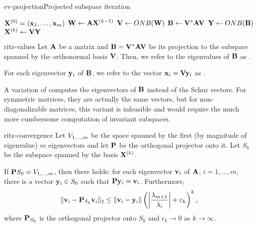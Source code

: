 
\begin{Algorithm*}{ev-projection}{Projected subspace iteration}
  \begin{algorithmic}[1]
    \Require $\matx^{(0)} = (\vx_1,\dots,\vx_m)$
    \State $\matw \gets \mata\matx^{(k-1)}$
    \State $\matv \gets ONB(\matw)$
    \State $\matb \gets \matv^*\mata\matv$
    \State $\maty \gets ONB(\matb)$
    \State $\matx^{(k)} \gets \matv\maty$
    \EndFor
  \end{algorithmic}
\end{Algorithm*}

\begin{Definition}{ritz-values}
  Let $\mata$ be a matrix and $\matb = \matv^*\mata\matv$ be its
  projection to the subspace spanned by the orthonormal basis
  $\matv$. Then, we refer to the eigenvalues of $\matb$ as
  .

  For each eigenvector $\vy_i$ of $\matb$, we refer to the vector
  $\vx_i = \matv\vy_i$ as .
\end{Definition}

\begin{remark}
  A variation of  computes the
  eigenvectors of $\matb$ instead of the Schur vectors. For symmetric
  matrices, they are actually the same vectors, but for
  non-diagonalizable matrices, this variant is infeasible and would
  require the much more cumbersome computation of invariant subspaces.
\end{remark}

\begin{Theorem}{ritz-convergence}
  Let $\esp{1,\dots,m}$ be the space spanned by the first (by
  magnitude of eigenvalue) $m$ eigenvectors and let $\matp$ be the
  orthogonal projector onto it. Let $S_k$ be the subspace spanned by
  the basis $\matx^{(k)}$.
  
  If $\matp S_0 = \esp{1,\dots,m}$, then there holds: for each
  eigenvector $\vv_i$ of $\mata$, $i=1,\dots,m$, there is a vector
  $\vy_i\in S_0$ such that $\matp\vy_i = \vv_i$. Furthermore,
  \begin{gather}
    \norm{\vv_i - \matp_{S_k} \vv_i}_2 \le \norm{\vv_i-\vy_i}
    \left(\abs*{\frac{\lambda_{m+1}}{\lambda_i}}+\epsilon_k\right)^k,
  \end{gather}
  where $\matp_{S_k}$ is the orthogonal projector onto $S_k$ and
  $\epsilon_k\to 0$ as $k \to \infty$.
\end{Theorem}

